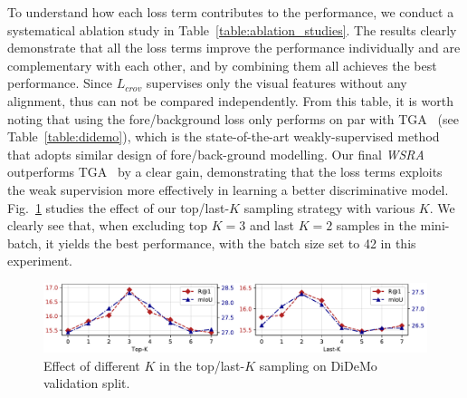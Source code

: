 To understand how each loss term contributes to the performance,
we conduct a systematical ablation study in Table~\ref{table:ablation_studies}. 
The results clearly demonstrate that all the loss terms improve the performance individually and are complementary with each other, and by combining them all achieves the best performance. Since $L_{crov}$ supervises only the visual features without any alignment, thus can not be compared independently.
From this table, it is worth noting that using the  fore/background loss only performs on par with TGA~\citep{Mithun_2019_CVPR} (see Table~\ref{table:didemo}), which is the state-of-the-art weakly-supervised method that adopts similar design of fore/back-ground modelling. 
Our final \textit{WSRA} outperforms TGA~\citep{Mithun_2019_CVPR} by a clear gain,
demonstrating that the loss terms  exploits the  weak supervision more
effectively in learning a better discriminative model.
Fig.~\ref{figure:k_sample} studies the effect of our 
top/last-$K$ sampling strategy with various $K$. 
We clearly see that, when excluding top $K=3$ and last $K=2$ samples in the mini-batch, it yields the best performance,
with the batch size set to 42 in this experiment.

\begin{figure}[t]
\includegraphics[width=.95\textwidth]{images/wsra_lask_K.pdf}
\centering
\caption{\small  Effect of different $K$ in the top/last-$K$ sampling on DiDeMo validation split.}
\label{figure:k_sample}
\end{figure}


